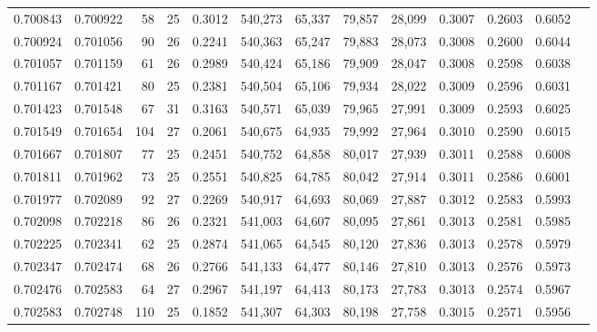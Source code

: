 \begin{tabular}{rrrrrrrrrrrrr}
0.700843 & 0.700922 &    58 &  25 &                                     0.3012 & 540,273 &  65,337 &  79,857 &  28,099 & 0.3007 & 0.2603 & 0.6052 \\
0.700924 & 0.701056 &    90 &  26 &                                     0.2241 & 540,363 &  65,247 &  79,883 &  28,073 & 0.3008 & 0.2600 & 0.6044 \\
0.701057 & 0.701159 &    61 &  26 &                                     0.2989 & 540,424 &  65,186 &  79,909 &  28,047 & 0.3008 & 0.2598 & 0.6038 \\
0.701167 & 0.701421 &    80 &  25 &                                     0.2381 & 540,504 &  65,106 &  79,934 &  28,022 & 0.3009 & 0.2596 & 0.6031 \\
0.701423 & 0.701548 &    67 &  31 &                                     0.3163 & 540,571 &  65,039 &  79,965 &  27,991 & 0.3009 & 0.2593 & 0.6025 \\
0.701549 & 0.701654 &   104 &  27 &                                     0.2061 & 540,675 &  64,935 &  79,992 &  27,964 & 0.3010 & 0.2590 & 0.6015 \\
0.701667 & 0.701807 &    77 &  25 &                                     0.2451 & 540,752 &  64,858 &  80,017 &  27,939 & 0.3011 & 0.2588 & 0.6008 \\
0.701811 & 0.701962 &    73 &  25 &                                     0.2551 & 540,825 &  64,785 &  80,042 &  27,914 & 0.3011 & 0.2586 & 0.6001 \\
0.701977 & 0.702089 &    92 &  27 &                                     0.2269 & 540,917 &  64,693 &  80,069 &  27,887 & 0.3012 & 0.2583 & 0.5993 \\
0.702098 & 0.702218 &    86 &  26 &                                     0.2321 & 541,003 &  64,607 &  80,095 &  27,861 & 0.3013 & 0.2581 & 0.5985 \\
0.702225 & 0.702341 &    62 &  25 &                                     0.2874 & 541,065 &  64,545 &  80,120 &  27,836 & 0.3013 & 0.2578 & 0.5979 \\
0.702347 & 0.702474 &    68 &  26 &                                     0.2766 & 541,133 &  64,477 &  80,146 &  27,810 & 0.3013 & 0.2576 & 0.5973 \\
0.702476 & 0.702583 &    64 &  27 &                                     0.2967 & 541,197 &  64,413 &  80,173 &  27,783 & 0.3013 & 0.2574 & 0.5967 \\
0.702583 & 0.702748 &   110 &  25 &                                     0.1852 & 541,307 &  64,303 &  80,198 &  27,758 & 0.3015 & 0.2571 & 0.5956 \\

\end{tabular}

